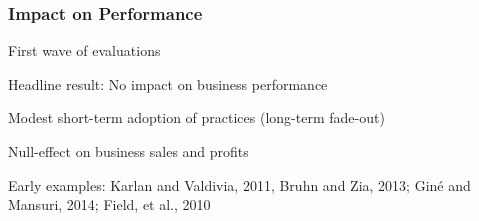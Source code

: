 \documentclass[hideothersubsections, usenames,dvipsnames,11pt]{beamer}
\newenvironment{itemize_2pt}{\itemize\addtolength{\itemsep}{2pt}}{\enditemize}
\begin{document}

\begin{frame}
\frametitle{Impact on Performance}
First wave of evaluations
	\begin{itemize_2pt}
	\item  Headline result: \textcolor{bdf}{No impact on business performance}
	\begin{itemize_2pt}
		\item Modest short-term adoption of practices (long-term fade-out)
		\item Null-effect on business sales and profits
		\item Early examples: \textcolor{camel}{Karlan and Valdivia, 2011, Bruhn and Zia, 2013; Giné and Mansuri, 2014; Field, et al., 2010} 
	
	\end{itemize_2pt}
\end{itemize_2pt}
\end{frame}
\end{document}
